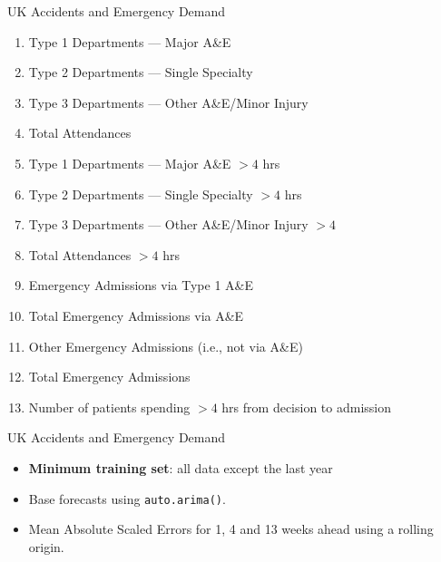 \documentclass[14pt]{beamer}
\makeatletter
\def\biz{\begin{itemize}[<+-| alert@+>]}
\def\eiz{\end{itemize}}
\makeatother
\begin{document}
\begin{frame}{\large UK Accidents and Emergency Demand}\fontsize{13}{15}\sf
\begin{enumerate}
\item Type 1 Departments --- Major A\&E
\item Type 2 Departments --- Single Specialty
\item Type 3 Departments --- Other A\&E/Minor Injury
\item Total Attendances
\item Type 1 Departments --- Major A\&E $>4$ hrs
\item Type 2 Departments --- Single Specialty $>4$ hrs
\item Type 3 Departments --- Other A\&E/Minor Injury $>4$ 
\item Total Attendances $>4$  hrs
\item Emergency Admissions via Type 1 A\&E
\item Total Emergency Admissions via A\&E
\item Other Emergency Admissions (i.e., not via A\&E)
\item Total Emergency Admissions
\item Number of patients spending $>4$ hrs from decision to admission
\end{enumerate}
\end{frame}

\begin{frame}{\large UK Accidents and Emergency Demand}\vspace*{-0.3cm}
\biz
\item \textbf{Minimum training set}: all data except the last year
\item Base forecasts using \texttt{auto.arima()}.
\item Mean Absolute Scaled Errors for 1, 4 and 13 weeks ahead using a rolling origin.
\eiz
\pause\fontsize{12}{14}\sf
{}

\end{frame}
\end{document}
